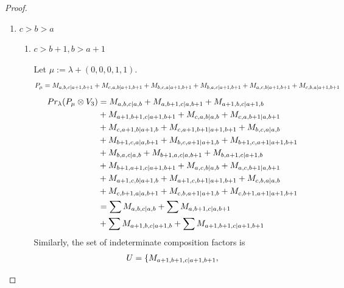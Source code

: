 \begin{proof}
\begin{enumerate}
    \item $c>b>a$
      \begin{enumerate}
        \item $c>b+1,b>a+1$ \par
        Let $\mu:=\lambda + (0,0,0,1,1) $.
        \begin{equation}\notag
          \begin{aligned}
            P_\mu = M_{a,b,c|a+1,b+1}
+ M_{c,a,b|a+1,b+1}
+ M_{b,c,a|a+1,b+1}
+ M_{b,a,c|a+1,b+1}
+ M_{a,c,b|a+1,b+1}
+ M_{c,b,a|a+1,b+1}
          \end{aligned}
        \end{equation}
        \begin{equation}\notag
          \begin{aligned}
            Pr_{\lambda}(P_\mu \otimes V_{3}) &=
M_{a,b,c|a,b}
+ M_{a,b+1,c|a,b+1}
+ M_{a+1,b,c|a+1,b}\\
                                              &
+ M_{a+1,b+1,c|a+1,b+1}
+ M_{c,a,b|a,b}
+ M_{c,a,b+1|a,b+1}\\
                                              &
+ M_{c,a+1,b|a+1,b}
+ M_{c,a+1,b+1|a+1,b+1}
+ M_{b,c,a|a,b}\\
                                              &
+ M_{b+1,c,a|a,b+1}
+ M_{b,c,a+1|a+1,b}
+ M_{b+1,c,a+1|a+1,b+1}\\
                                              &
+ M_{b,a,c|a,b}
+ M_{b+1,a,c|a,b+1}
+ M_{b,a+1,c|a+1,b}\\
                                              &
+ M_{b+1,a+1,c|a+1,b+1}
+ M_{a,c,b|a,b}
+ M_{a,c,b+1|a,b+1}\\
                                              &
+ M_{a+1,c,b|a+1,b}
+ M_{a+1,c,b+1|a+1,b+1}
+ M_{c,b,a|a,b}\\
                                              &
+ M_{c,b+1,a|a,b+1}
+ M_{c,b,a+1|a+1,b}
+ M_{c,b+1,a+1|a+1,b+1} \\
                                               &=
\sum M_{a,b,c|a,b}
+ \sum M_{a,b+1,c|a,b+1}\\
                                              &
+ \sum M_{a+1,b,c|a+1,b}
+ \sum M_{a+1,b+1,c|a+1,b+1}
          \end{aligned}
        \end{equation}
      Similarly, the set of indeterminate composition factors is 
\begin{equation}\notag
  \begin{aligned}
    U = \{
M_{a+1,b+1,c|a+1,b+1},

\end{aligned}
\end{equation}
\end{enumerate}
\end{enumerate}
\end{proof}
